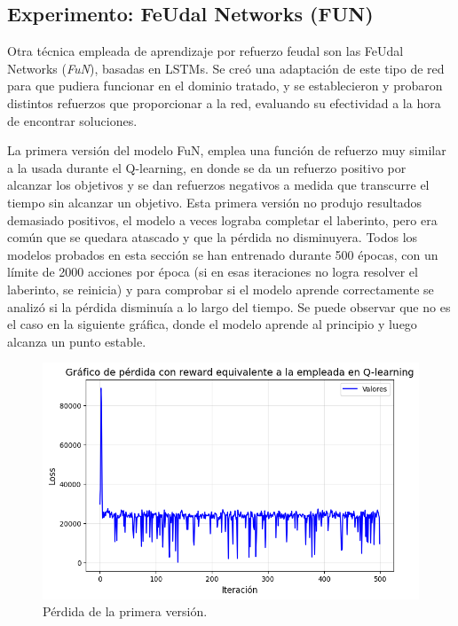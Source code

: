 \documentclass[letterpaper]{article} %
\begin{document}
\subsection{Experimento: FeUdal Networks (FUN)}

Otra técnica empleada de aprendizaje por refuerzo feudal son las FeUdal Networks (\textit{FuN}), basadas en LSTMs. Se creó una adaptación de este tipo de red para que pudiera funcionar en el dominio tratado, y se establecieron y probaron distintos refuerzos que proporcionar a la red, evaluando su efectividad a la hora de encontrar soluciones.

La primera versión del modelo FuN, emplea una función de refuerzo muy similar a la usada durante el Q-learning, en donde se da un refuerzo positivo por alcanzar los objetivos y se dan refuerzos negativos a medida que transcurre el tiempo sin alcanzar un objetivo. 
Esta primera versión no produjo resultados demasiado positivos, el modelo a veces lograba completar el laberinto, pero era común que se quedara atascado y que la pérdida no disminuyera. 
Todos los modelos probados en esta sección se han entrenado durante 500 épocas, con un límite de 2000 acciones por época (si en esas iteraciones no logra resolver el laberinto, 
se reinicia) y para comprobar si el modelo aprende correctamente se analizó si la pérdida disminuía a lo largo del tiempo. Se puede observar que no es el caso en la siguiente gráfica, donde el modelo aprende al principio y luego alcanza un punto estable.

\begin{figure}[H]
    \centering
    \includegraphics[width=0.9\columnwidth]{FuN_1.png}
    \caption{Pérdida de la primera versión.\label{fig:FuN6}}
\end{figure}
\end{document}
